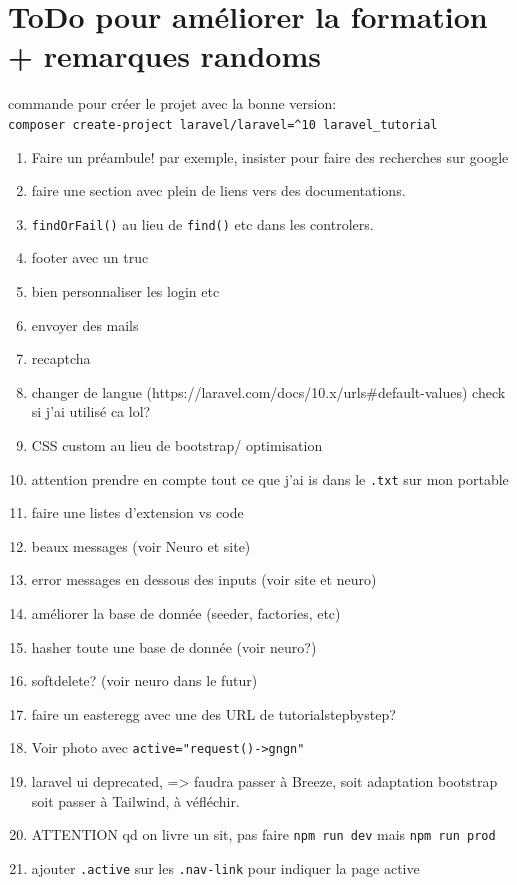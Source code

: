 \documentclass[internal]{nhitec_design}
\begin{document}
\section{ToDo pour améliorer la formation + remarques randoms}
commande pour créer le projet avec la bonne version: \\
\verb|composer create-project laravel/laravel=^10 laravel_tutorial|
\begin{enumerate}
    \item Faire un préambule! par exemple, insister pour faire des recherches sur google
    \item faire une section avec plein de liens vers des documentations.
    \item \verb|findOrFail()| au lieu de \verb|find()| etc dans les controlers.
    \item footer avec un truc
    \item bien personnaliser les login etc
    \item envoyer des mails
    \item recaptcha
    \item changer de langue (https://laravel.com/docs/10.x/urls\#default-values) check si j'ai utilisé ca lol?
    \item CSS custom au lieu de bootstrap/ optimisation
    \item attention  prendre en compte tout ce que j'ai is dans le \verb|.txt| sur mon portable
    \item faire une listes d'extension vs code
    \item beaux messages (voir Neuro et site)
    \item error messages en dessous des inputs (voir site et neuro)
    \item améliorer la base de donnée (seeder, factories, etc)
    \item hasher toute une base de donnée (voir neuro?)
    \item softdelete? (voir neuro dans le futur)
    \item faire un easteregg avec une des URL de tutorialstepbystep?
    \item Voir photo avec \verb|active="request()->gngn"|
    \item laravel ui deprecated, => faudra passer à Breeze, soit adaptation bootstrap soit passer à Tailwind, à véfléchir.
    \item ATTENTION qd on livre un sit, pas faire \verb|npm run dev| mais \verb|npm run prod|
    \item ajouter \verb|.active| sur les \verb|.nav-link| pour indiquer la page active
\end{enumerate}
\end{document}
